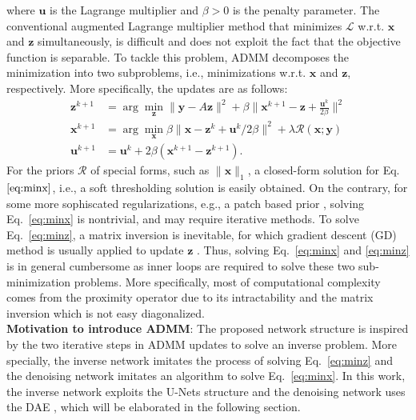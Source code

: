 \documentclass[10pt,twocolumn,letterpaper]{article}
\begin{document}
where $\mathbf{u}$ is the Lagrange multiplier and $\beta > 0$ is the penalty parameter. 
The conventional augmented Lagrange multiplier method that minimizes $\mathcal{L}$ w.r.t. $\mathbf{x}$ and $\mathbf{z}$ simultaneously,
is difficult and does not exploit the fact that the objective function is separable. To tackle this problem, ADMM decomposes the minimization into two subproblems, i.e., minimizations w.r.t. $\mathbf{x}$ and $\mathbf{z}$, respectively. 
More specifically, the updates are as follows: 
%
\begin{align}
\mathbf{z}^{k+1} &= \arg\min_{\mathbf{z}} \|\mathbf{y} - A\mathbf{z}\|^2 + \beta \| \mathbf{x}^{k+1} - \mathbf{z} + \frac{\mathbf{u}^k }{2\beta} \|^2 \label{eq:minz}\\
\mathbf{x}^{k+1} &= \arg\min_{\mathbf{x}} \beta \| \mathbf{x} - \mathbf{z}^k + \mathbf{u}^k/2\beta\|^2 + \lambda\mathcal{R}(\mathbf{x}; \mathbf{y}) \label{eq:minx}\\
\mathbf{u}^{k+1} &= \mathbf{u}^k + 2\beta(\mathbf{x}^{k+1} - \mathbf{z}^{k+1}). 
\label{eq:updateu}
\end{align}
For the priors $\mathcal{R}$ of special forms, such as $\|\mathbf{x}\|_1$, a closed-form solution for Eq.~$\eqref{eq:minx}$, i.e., a soft thresholding solution is easily obtained. On the contrary, for some more sophiscated regularizations, e.g., a patch based prior \cite{Elad2006,Yang2010}, solving Eq.~\eqref{eq:minx} is nontrivial, and may require iterative methods. To solve Eq.~\eqref{eq:minz}, a matrix inversion is inevitable, for which gradient descent (GD) method is usually applied to update $\mathbf{z}$ \cite{chang2017one}. 
Thus, solving Eq.~\eqref{eq:minx} and \eqref{eq:minz} is in general cumbersome as inner loops are required to solve these two sub-minimization problems. %
More specifically, most of computational complexity comes from the proximity operator due to its intractability and the matrix inversion which is not easy diagonalized. \\
{\bf{Motivation to introduce ADMM}}:
The proposed network structure is inspired by the two iterative steps in ADMM updates to solve an inverse problem. 
More specially, the inverse network imitates the process of solving Eq.~\eqref{eq:minz} and the denoising network imitates 
an algorithm to solve Eq.~\eqref{eq:minx}. 
In this work, the inverse network exploits the U-Nets structure \cite{ronneberger2015u} and the denoising network 
uses the DAE \cite{Vincent2008}, which will be elaborated in the following section.
\end{document}
